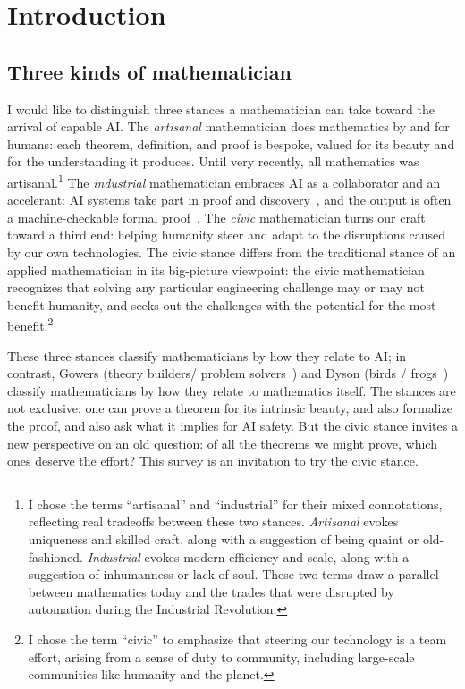 \section{Introduction}
\label{sec:intro}

\subsection{Three kinds of mathematician}

I would like to distinguish three stances a mathematician can take toward the arrival of capable AI. The \emph{artisanal} mathematician does mathematics by and for humans: each theorem, definition, and proof is bespoke, valued for its beauty and for the understanding it produces. Until very recently, all mathematics was artisanal.\footnote{I chose the terms ``artisanal'' and ``industrial'' for their mixed connotations, reflecting real tradeoffs between these two stances. \emph{Artisanal} evokes uniqueness and skilled craft, along with a suggestion of being quaint or old-fashioned. \emph{Industrial} evokes modern efficiency and scale, along with a suggestion of inhumanness or lack of soul. These two terms draw a parallel between mathematics today and the trades that were disrupted by automation during the Industrial Revolution.}
The \emph{industrial} mathematician embraces AI as a collaborator and an accelerant: AI systems take part in proof and discovery~\cite{spherepacking2026,openai2026unitdistance,alon2026remarks,sawin2026}, and the output is often a machine-checkable formal proof~\cite{mathlib2020}.
The \emph{civic} mathematician turns our craft toward a third end: helping humanity steer and adapt to the disruptions caused by our own technologies. The civic stance differs from the traditional stance of an applied mathematician in its big-picture viewpoint: the civic mathematician recognizes that solving any particular engineering challenge may or may not benefit humanity, and seeks out the challenges with the potential for the most benefit.\footnote{I chose the term ``civic'' to emphasize that steering our technology is a team effort, arising from a sense of duty to community, including large-scale communities like humanity and the planet.}

These three stances classify mathematicians by how they relate to AI; in contrast, Gowers (theory builders/ problem solvers~\cite{gowers2000}) and Dyson (birds / frogs~\cite{dyson2009}) classify mathematicians by how they relate to mathematics itself. 
The stances are not exclusive: one can prove a theorem for its intrinsic beauty, and also formalize the proof, and also ask what it implies for AI safety. But the civic stance invites a new perspective on an old question: of all the theorems we might prove, which ones deserve the effort?  This survey is an invitation to try the civic stance.


